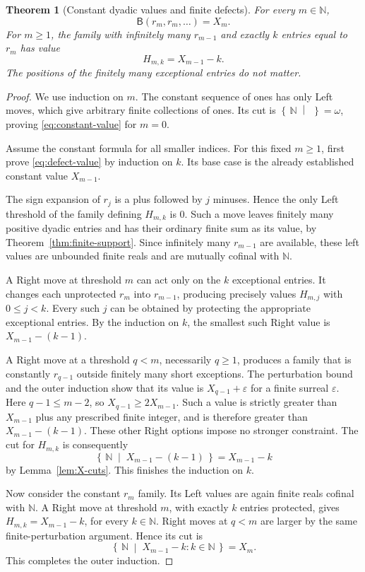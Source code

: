 \documentclass[11pt,letterpaper]{article}
\newtheorem{theorem}{Theorem}[section]
\theoremstyle{definition}
\theoremstyle{remark}
\newcommand{\NN}{\mathbb N}
\newcommand{\BB}{\mathsf B}
\newcommand{\cut}[2]{\left\{\,#1\;\middle|\;#2\,\right\}}
\begin{document}
\begin{theorem}[Constant dyadic values and finite defects]\label{thm:constants}
For every $m\in\NN$,
\begin{equation}\label{eq:constant-value}
                              \BB(r_m,r_m,\ldots)=X_m.
\end{equation}
For $m\geq1$, the family with infinitely many $r_{m-1}$ and exactly $k$ entries
equal to $r_m$ has value
\begin{equation}\label{eq:defect-value}
                              H_{m,k}=X_{m-1}-k.
\end{equation}
The positions of the finitely many exceptional entries do not matter.
\end{theorem}
\begin{proof}
We use induction on $m$. The constant sequence of ones has only Left moves,
which give arbitrary finite collections of ones. Its cut is
$\cut{\NN}{}=\omega$, proving \eqref{eq:constant-value} for $m=0$.

Assume the constant formula for all smaller indices. For this fixed $m\geq1$,
first prove \eqref{eq:defect-value} by induction on $k$. Its base case is the
already established constant value $X_{m-1}$.

The sign expansion of $r_j$ is a plus followed by $j$ minuses. Hence the only
Left threshold of the family defining $H_{m,k}$ is $0$. Such a move leaves
finitely many positive dyadic entries and has their ordinary finite sum as its
value, by Theorem~\ref{thm:finite-support}. Since infinitely many $r_{m-1}$ are
available, these left values are unbounded finite reals and are mutually
cofinal with $\NN$.

A Right move at threshold $m$ can act only on the $k$ exceptional entries.
It changes each unprotected $r_m$ into $r_{m-1}$, producing precisely values
$H_{m,j}$ with $0\leq j<k$. Every such $j$ can be obtained by protecting the
appropriate exceptional entries. By the induction on $k$, the smallest such
Right value is $X_{m-1}-(k-1)$.

A Right move at a threshold $q<m$, necessarily $q\geq1$, produces a family
that is constantly $r_{q-1}$ outside finitely many short exceptions. The
perturbation bound and the outer induction show that its value is
$X_{q-1}+\varepsilon$ for a finite surreal $\varepsilon$. Here
$q-1\leq m-2$, so $X_{q-1}\geq2X_{m-1}$. Such a value is strictly greater than
$X_{m-1}$ plus any prescribed finite integer, and is therefore greater than
$X_{m-1}-(k-1)$. These other Right options impose no stronger constraint.
The cut for $H_{m,k}$ is consequently
\[
                     \cut{\NN}{X_{m-1}-(k-1)}=X_{m-1}-k
\]
by Lemma~\ref{lem:X-cuts}. This finishes the induction on $k$.

Now consider the constant $r_m$ family. Its Left values are again finite reals
cofinal with $\NN$. A Right move at threshold $m$, with exactly $k$ entries
protected, gives $H_{m,k}=X_{m-1}-k$, for every $k\in\NN$. Right moves at
$q<m$ are larger by the same finite-perturbation argument. Hence its cut is
\[
                      \cut{\NN}{X_{m-1}-k:k\in\NN}=X_m.
\]
This completes the outer induction.
\end{proof}
\end{document}
